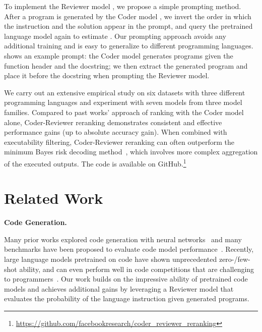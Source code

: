 \documentclass[nohyperref]{article}
\theoremstyle{plain}
\theoremstyle{definition}
\theoremstyle{remark}
\renewcommand{\paragraph}[1]{
     \textbf{#1} 
 }
\begin{document}
 To implement the Reviewer model , we propose a simple prompting method. After a program  is generated by the Coder model , we invert the order in which the instruction  and the solution  appear in the prompt, and query the pretrained language model again to estimate .
Our prompting approach avoids any additional training and is easy to generalize to different programming languages.
 shows an example prompt: the Coder model generates programs given the function header and the docstring; we then extract the generated program and place it before the docstring when prompting the Reviewer model.

We carry out an extensive empirical study on six datasets with three different programming languages and experiment with seven models from three model families. 
Compared to past works' approach of ranking with the Coder model  alone, Coder-Reviewer reranking demonstrates consistent and effective performance gains (up to  absolute accuracy gain).
When combined with executability filtering, Coder-Reviewer reranking can often outperform the minimum Bayes risk decoding method~\citep{mbr}, which involves more complex aggregation of the executed outputs.
The code is available on GitHub.\footnote{\url{https://github.com/facebookresearch/coder_reviewer_reranking}} \section{Related Work}
\paragraph{Code Generation.}
Many prior works explored code generation with neural networks~\citep{suggest-method-name, ling-etal-2016-latent, concode, syntactic-code, program-repair} and many benchmarks have been proposed to evaluate code model performance~\citep{apps, spider, nl2bash}.
Recently, large language models pretrained on code have shown unprecedented zero-/few-shot ability, and can even perform well in code competitions that are challenging to programmers~\citep{palm, codex,mbpp,alphacode}.
Our work builds on the impressive ability of pretrained code models and achieves additional gains by leveraging a Reviewer model that evaluates the probability of the language instruction given generated programs.
\end{document}
